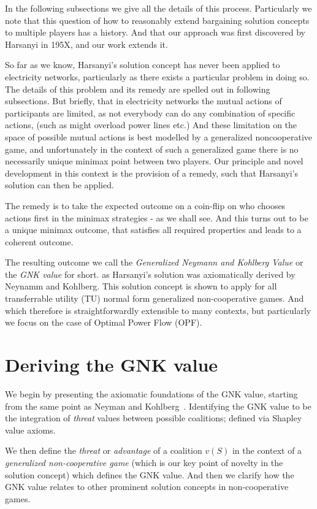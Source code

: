 In the following subsections we give all the details of this process. Particularly we note that this question of how to reasonably extend bargaining solution concepts to multiple players has a history.
And that our approach was first discovered by Harsanyi in 195X, and our work extends it.

So far as we know, Harsanyi's solution concept has never been applied to electricity networks, particularly as there exists a particular problem in doing so.
The details of this problem and its remedy are spelled out in following subsections.
But briefly, that in electricity networks the mutual actions of participants are limited, as not everybody can do any combination of specific actions, (such as might overload power lines etc.)
And these limitation on the space of possible mutual actions is best modelled by a generalized noncooperative game, and unfortunately in the context of such a generalized game there is no necessarily unique minimax point between two players.
Our principle and novel development in this context is the provision of a remedy, such that Harsanyi's solution can then be applied.

The remedy is to take the expected outcome on a coin-flip on who chooses actions first in the minimax strategies - as we shall see. And this turns out to be a unique minimax outcome, that satisfies all required properties and leads to a coherent outcome.

The resulting outcome we call the \textit{Generalized Neymann and Kohlberg Value} or the \textit{GNK value} for short.
as Harsanyi's solution was axiomatically derived by Neynamm and Kohlberg.
This solution concept is shown to apply for all transferrable utility (TU) normal form generalized non-cooperative games.
And which therefore is straightforwardly extensible to many contexts, but particularly we focus on the case of Optimal Power Flow (OPF).

\section{Deriving the GNK value}\label{the_value_def2}

We begin by presenting the axiomatic foundations of the GNK value, starting from the same point as Neyman and Kohlberg~\cite{value2}.
Identifying the GNK value to be the integration of \emph{threat} values between possible coalitions; defined via Shapley value axioms.

We then define the \emph{threat} or \emph{advantage} of a coalition $v(S)$ in the context of a \textit{generalized non-cooperative game} (which is our key point of novelty in the solution concept) which defines the GNK value.
And then we clarify how the GNK value relates to other prominent solution concepts in non-cooperative games.


